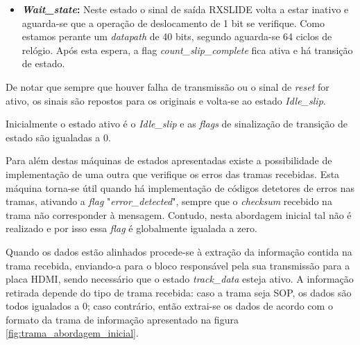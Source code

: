 \begin{enumerate}
\begin{itemize}
		\item \textbf{\textit{Wait\_state}:} Neste estado o sinal de saída RXSLIDE volta a estar inativo e aguarda-se que a operação de deslocamento de 1 bit se verifique. Como estamos perante um \textit{datapath} de 40 bits, segundo \cite{R011} aguarda-se 64 ciclos de relógio. Após esta espera, a flag \textit{count\_slip\_complete} fica ativa e há transição de estado.
	\end{itemize}
	
	De notar que sempre que houver falha de transmissão ou o sinal de \textit{reset} for ativo, os sinais são repostos para os originais e volta-se ao estado \textit{Idle\_slip}.
	
	
	Inicialmente o estado ativo é o {\textit{Idle\_slip} }e as \textit{flags} de sinalização de transição de estado são igualadas a 0.
	
\end{enumerate}

Para além destas máquinas de estados apresentadas existe a possibilidade de implementação de uma outra que verifique os erros das tramas recebidas. Esta máquina torna-se útil quando há implementação de códigos detetores de erros nas tramas, ativando a \textit{flag}  "\textit{error\_detected}", sempre que o \textit{checksum} recebido na trama não corresponder à mensagem. Contudo, nesta abordagem inicial tal não é realizado e por isso essa \textit{flag} é globalmente igualada a zero.

Quando os dados estão alinhados procede-se à extração da informação contida na trama recebida, enviando-a para o bloco responsável pela sua transmissão para a placa HDMI, sendo necessário que o estado  \textit{track\_data} esteja ativo. A informação retirada depende do tipo de trama recebida: caso a trama seja SOP, os dados são todos igualados a 0; caso contrário, então extrai-se os dados de acordo com o formato da trama de informação apresentado na figura \ref{fig:trama_abordagem_inicial}.


%

